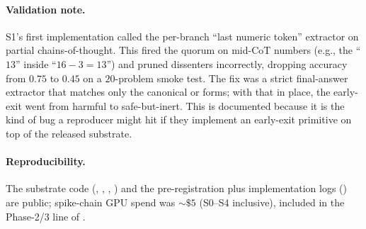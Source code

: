 \paragraph{Validation note.}
S1's first implementation called the per-branch ``last numeric
token'' extractor on partial chains-of-thought.  This fired the
quorum on mid-CoT numbers (e.g., the ``$13$'' inside
``$16 - 3 = 13$'') and pruned dissenters incorrectly, dropping
accuracy from $0.75$ to $0.45$ on a $20$-problem smoke test.  The
fix was a strict final-answer extractor that matches only the
canonical  or  forms; with that
in place, the early-exit went from harmful to safe-but-inert.  This
is documented because it is the kind of bug a reproducer might hit
if they implement an early-exit primitive on top of the released
substrate.

\paragraph{Reproducibility.}
The substrate code (, ,
, ) and the
pre-registration plus implementation logs
() are public; spike-chain GPU spend was
$\sim \$5$ (S0--S4 inclusive), included in the Phase-2/3 line of
.
